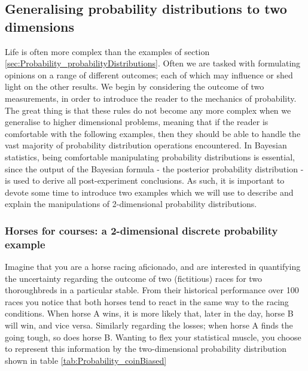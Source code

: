 \documentclass[11pt,fullpage]{book}
\begin{document}
\subsection{Generalising probability distributions to two dimensions}
Life is often more complex than the examples of section \ref{sec:Probability_probabilityDistributions}. Often we are tasked with formulating opinions on a range of different outcomes; each of which may influence or shed light on the other results. We begin by considering the outcome of two measurements, in order to introduce the reader to the mechanics of probability. The great thing is that these rules do not become any more complex when we generalise to higher dimensional problems, meaning that if the reader is comfortable with the following examples, then they should be able to handle the vast majority of probability distribution operations encountered. In Bayesian statistics, being comfortable manipulating probability distributions is essential, since the output of the Bayesian formula - the posterior probability distribution - is used to derive all post-experiment conclusions. As such, it is important to devote some time to introduce two examples which we will use to describe and explain the manipulations of 2-dimensional probability distributions.

\subsubsection{Horses for courses: a 2-dimensional discrete probability example}\label{sec:Probability_biasedCoinsTwoDimensionalDiscrete}
Imagine that you are a horse racing aficionado, and are interested in quantifying the uncertainty regarding the outcome of two (fictitious) races for two thoroughbreds in a particular stable. From their historical performance over 100 races you notice that both horses tend to react in the same way to the racing conditions. When horse A wins, it is more likely that, later in the day, horse B will win, and vice versa. Similarly regarding the losses; when horse A finds the going tough, so does horse B. Wanting to flex your statistical muscle, you choose to represent this information by the two-dimensional probability distribution shown in table \ref{tab:Probability_coinBiased}
\end{document}
